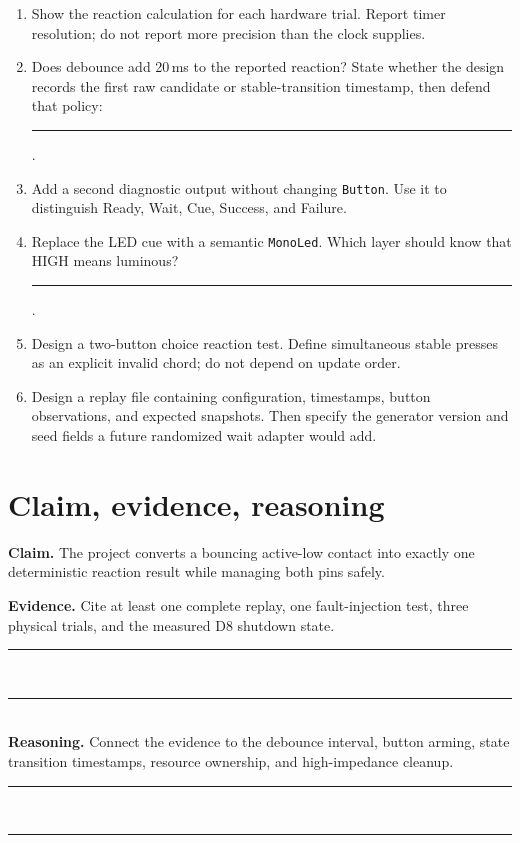 \documentclass[11pt]{article}
\newcommand{\blank}[1]{\rule{#1}{0.4pt}}
\begin{document}
\begin{enumerate}
  \item Show the reaction calculation for each hardware trial. Report timer
        resolution; do not report more precision than the clock supplies.
  \item Does debounce add 20\,ms to the reported reaction? State whether the
        design records the first raw candidate or stable-transition timestamp,
        then defend that policy:\\[3pt]
        \blank{0.92\linewidth}.
  \item Add a second diagnostic output without changing \texttt{Button}. Use it
        to distinguish Ready, Wait, Cue, Success, and Failure.
  \item Replace the LED cue with a semantic \texttt{MonoLed}. Which layer should
        know that HIGH means luminous? \blank{3.4in}.
  \item Design a two-button choice reaction test. Define simultaneous stable
        presses as an explicit invalid chord; do not depend on update order.
  \item Design a replay file containing configuration, timestamps, button
        observations, and expected snapshots. Then specify the generator version
        and seed fields a future randomized wait adapter would add.
\end{enumerate}

\section{Claim, evidence, reasoning}

\textbf{Claim.} The project converts a bouncing active-low contact into exactly
one deterministic reaction result while managing both pins safely.

\textbf{Evidence.} Cite at least one complete replay, one fault-injection test,
three physical trials, and the measured D8 shutdown state.\\[2pt]
\blank{\linewidth}\\[8pt]
\blank{\linewidth}\\[8pt]

\textbf{Reasoning.} Connect the evidence to the debounce interval, button arming,
state transition timestamps, resource ownership, and high-impedance cleanup.\\[2pt]
\blank{\linewidth}\\[8pt]
\blank{\linewidth}\\[8pt]
\end{document}
